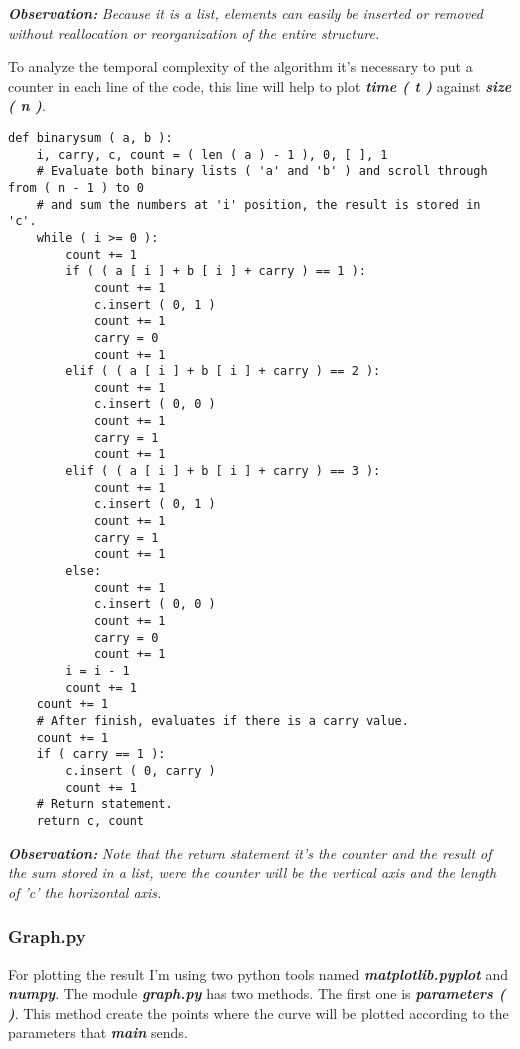 \documentclass[10pt,a4paper]{article}
\begin{document}
{\bfseries{\itshape Observation:}} {\itshape Because it is a list, elements can easily be inserted or removed without reallocation or reorganization of the entire structure.} \hfill \break

\pagebreak

To analyze the temporal complexity of the algorithm it's necessary to put a counter in each line of the code, this line will help to plot {\bfseries\itshape time ( t )} against {\bfseries\itshape size ( n )}. \hfill \break

\begin{lstlisting}
def binarysum ( a, b ):
    i, carry, c, count = ( len ( a ) - 1 ), 0, [ ], 1
    # Evaluate both binary lists ( 'a' and 'b' ) and scroll through from ( n - 1 ) to 0
    # and sum the numbers at 'i' position, the result is stored in 'c'.
    while ( i >= 0 ):
        count += 1
        if ( ( a [ i ] + b [ i ] + carry ) == 1 ):
            count += 1
            c.insert ( 0, 1 )
            count += 1
            carry = 0
            count += 1
        elif ( ( a [ i ] + b [ i ] + carry ) == 2 ):
            count += 1
            c.insert ( 0, 0 )
            count += 1
            carry = 1
            count += 1
        elif ( ( a [ i ] + b [ i ] + carry ) == 3 ):
            count += 1
            c.insert ( 0, 1 )
            count += 1
            carry = 1
            count += 1
        else:
            count += 1
            c.insert ( 0, 0 )
            count += 1
            carry = 0
            count += 1
        i = i - 1
        count += 1
    count += 1
    # After finish, evaluates if there is a carry value.
    count += 1
    if ( carry == 1 ):
        c.insert ( 0, carry )
        count += 1
    # Return statement.
    return c, count
\end{lstlisting} 
{\bfseries\itshape Observation:} {\itshape Note that the return statement it's the counter and the result of the sum stored in a list, were the counter will be the vertical axis and the length of 'c' the horizontal axis.} \hfill \break

\pagebreak

\subsubsection{Graph.py}

For plotting the result I'm using two python tools named {\bfseries\itshape matplotlib.pyplot} and {\bfseries\itshape numpy}. The module {\bfseries\itshape graph.py} has two methods. The first one is {\bfseries\itshape parameters ( )}. This method create the points where the curve will be plotted according to the parameters that {\bfseries\itshape main} sends. \hfill \break
\end{document}

